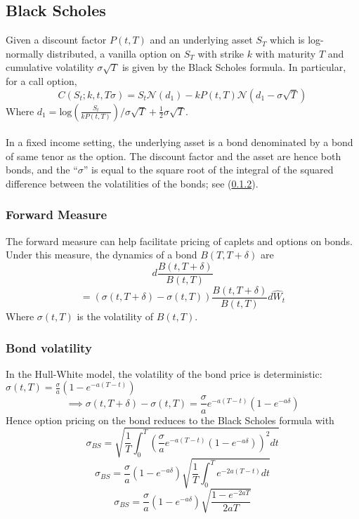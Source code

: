 \documentclass{article}
\theoremstyle{definition}
\begin{document}
\subsection{Black Scholes} \label{BS}
Given a discount factor \(P(t, T)\) and an underlying asset \(S_T\) which is log-normally distributed, a vanilla option on \(S_T\) with strike \(k\) with maturity \(T\) and cumulative volatility \(\sigma \sqrt{T}\) is given by the Black Scholes formula.  In particular, for a call option,
\[C(S_t; k, t, T \sigma)=S_t \mathcal{N}(d_1)-kP(t, T)\mathcal{N}(d_1-\sigma \sqrt{T})\]
Where \(d_1=\mathrm{log}\left(\frac{S_t}{kP(t, T)}\right)/\sigma \sqrt{T}+\frac{1}{2}\sigma \sqrt{T}\).
\\
\\
In a fixed income setting, the underlying asset is a bond denominated by a bond of same tenor as the option.  The discount factor and the asset are hence both bonds, and the ``\(\sigma\)'' is equal to the square root of the integral of the squared difference between the volatilities of the bonds; see (\ref{bondvolatility}).

\subsubsection{Forward Measure}

The forward measure can help facilitate pricing of caplets and options on bonds.  Under this measure, the dynamics of a bond \(B(T, T+\delta)\) are
\[d\frac{B(t, T+\delta)}{B(t, T)}\]
\[=\left(\sigma(t, T+\delta)-\sigma(t, T)\right) \frac{B(t, T+\delta)}{B(t, T)}d\hat{W}_t\]
Where \(\sigma(t, T)\) is the volatility of \(B(t, T)\).

\subsubsection{Bond volatility} \label{bondvolatility}
In the Hull-White model, the volatility of the bond price is deterministic: \(\sigma(t, T)=\frac{\sigma}{a}(1-e^{-a(T-t)})\)
\[\implies \sigma(t, T+\delta)-\sigma(t, T)=\frac{\sigma}{a}e^{-a(T-t)}\left(1-e^{-a\delta}\right)\]
Hence option pricing on the bond reduces to the Black Scholes formula with \[\sigma_{BS}=\sqrt{\frac{1}{T} \int_0 ^ T \left(\frac{\sigma}{a}e^{-a(T-t)}\left(1-e^{-a\delta}\right)\right)^2 dt}\]
\[\sigma_{BS}=\frac{\sigma}{a}\left(1-e^{-a\delta}\right)\sqrt{\frac{1}{T} \int_0 ^ T e^{-2a(T-t)} dt}\]
\[\sigma_{BS}=\frac{\sigma}{a}\left(1-e^{-a\delta}\right)\sqrt{\frac{1-e^{-2aT}}{2aT}}\]
\end{document}
